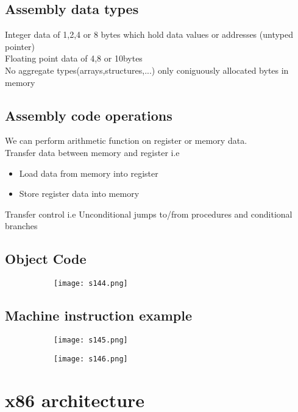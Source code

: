 \documentclass[8pt]{extreport}
\begin{document}
\subsection{Assembly data types}

Integer data of 1,2,4 or 8 bytes which hold data values or addresses (untyped pointer)\\
Floating point data of 4,8 or 10bytes\\
No aggregate types(arrays,structures,...) only coniguously allocated bytes in memory

\subsection{Assembly code operations}

We can perform arithmetic function on register or memory data.\\
Transfer data  between memory and register i.e
\begin{itemize}
\item Load data from memory into register
\item Store register data into memory
\end{itemize}
Transfer control i.e Unconditional jumps to/from procedures and conditional branches

\subsection{Object Code}
\begin{figure}[H]
\centering
\begin{subfigure}[b]{0.4\linewidth}
\texttt{[image: s144.png]}
\end{subfigure}
\end{figure}

\subsection{Machine instruction example}
\begin{figure}[H]
\centering
\begin{subfigure}[b]{0.4\linewidth}
\texttt{[image: s145.png]}
\end{subfigure}
\begin{subfigure}[b]{0.4\linewidth}
\texttt{[image: s146.png]}
\end{subfigure}
\end{figure}
\section{x86 architecture}
\end{document}

